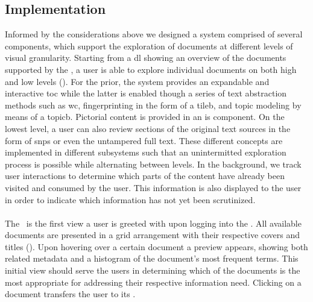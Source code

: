 \subsection{Implementation}\label{sec:implementation}
Informed by the considerations above we designed a system comprised of several components, which support the exploration of documents at different levels of visual granularity. 
%
Starting from a \acrfull{dl} showing an overview of the documents supported by the \apluschis, a user is able to explore individual documents on both high and low levels ().
%
For the prior, the system provides an expandable and interactive \acrfull{toc} while the latter is enabled though a series of text abstraction methods such as \acrfull{wc}, fingerprinting in the form of a \acrfull{tileb}, and topic modeling by means of a \acrfull{topicb}.
%
Pictorial content is provided in an \acrfull{is} component.
%
On the lowest level, a user can also review sections of the original text sources in the form of \acrfull{snps} or even the untampered full text. 
%
These different concepts are implemented in different subsystems such that an unintermitted exploration process is possible while alternating between levels.
%
In the background, we track user interactions to determine which parts of the content have already been visited and consumed by the user. 
%
This information is also displayed to the user in order to indicate which information has not yet been scrutinized.



\paragraph*{\DocumentLibrary}
%
The \dl\ is the first view a user is greeted with upon logging into the \apluschis.
%
All available documents are presented in a grid arrangement with their respective covers and titles ().
%
Upon hovering over a certain document a preview appears, showing both related metadata and a histogram of the document's most frequent terms. 
%
This initial view should serve the users in determining which of the documents is the most appropriate for addressing their respective information need.
%
Clicking on a document transfers the user to its \toc.


